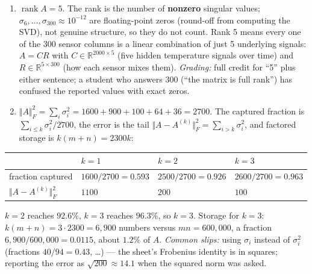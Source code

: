 \documentclass[
  11pt,
]{article}
\newcounter{none} %
\begin{document}
\begin{solutionbox}

\begin{enumerate}
\def\labelenumi{(\alph{enumi})}
\item
  \(\operatorname{rank}A = 5\). The rank is the number of
  \textbf{nonzero} singular values;
  \(\sigma_6,\ldots,\sigma_{300}\approx10^{-12}\) are floating-point
  zeros (round-off from computing the SVD), not genuine structure, so
  they do not count. Rank 5 means every one of the 300 sensor columns is
  a linear combination of just 5 underlying signals: \(A = CR\) with
  \(C\in\mathbb R^{2000\times5}\) (five hidden temperature signals over
  time) and \(R\in\mathbb R^{5\times300}\) (how each sensor mixes them).
  \emph{Grading:} full credit for ``5'' plus either sentence; a student
  who answers 300 (``the matrix is full rank'') has confused the
  reported values with exact zeros.
\item
  \(\Vert A\Vert_F^2 = \sum_i\sigma_i^2 = 1600+900+100+64+36 = 2700\).
  The captured fraction is \(\sum_{i\le k}\sigma_i^2/2700\), the error
  is the tail \(\Vert A-A^{(k)}\Vert_F^2 = \sum_{i>k}\sigma_i^2\), and
  factored storage is \(k(m+n) = 2300k\):
\end{enumerate}

{\def\LTcaptype{none} %
\begin{longtable}[]{@{}
  >{\raggedright\arraybackslash}p{}
  >{\centering\arraybackslash}p{}
  >{\centering\arraybackslash}p{}
  >{\centering\arraybackslash}p{}@{}}
\toprule\noalign{}
\begin{minipage}[b]{\linewidth}\raggedright
\end{minipage} & \begin{minipage}[b]{\linewidth}\centering
\(k=1\)
\end{minipage} & \begin{minipage}[b]{\linewidth}\centering
\(k=2\)
\end{minipage} & \begin{minipage}[b]{\linewidth}\centering
\(k=3\)
\end{minipage} \\
\midrule\noalign{}
\endhead
\bottomrule\noalign{}
\endlastfoot
fraction captured & \(1600/2700 = 0.593\) & \(2500/2700 = 0.926\) &
\(2600/2700 = 0.963\) \\
\(\Vert A - A^{(k)}\Vert_F^2\) & \(1100\) & \(200\) & \(100\) \\
\end{longtable}
}

\(k=2\) reaches \(92.6\%\), \(k=3\) reaches \(96.3\%\), so \(k = 3\).
Storage for \(k=3\): \(k(m+n) = 3\cdot2300 = 6{,}900\) numbers versus
\(mn = 600{,}000\), a fraction \(6{,}900/600{,}000 = 0.0115\), about
\(1.2\%\) of \(A\). \emph{Common slips:} using \(\sigma_i\) instead of
\(\sigma_i^2\) (fractions \(40/94 = 0.43\), \ldots) --- the sheet's
Frobenius identity is in squares; reporting the error as
\(\sqrt{200}\approx14.1\) when the squared norm was asked.

\end{solutionbox}
\end{document}
